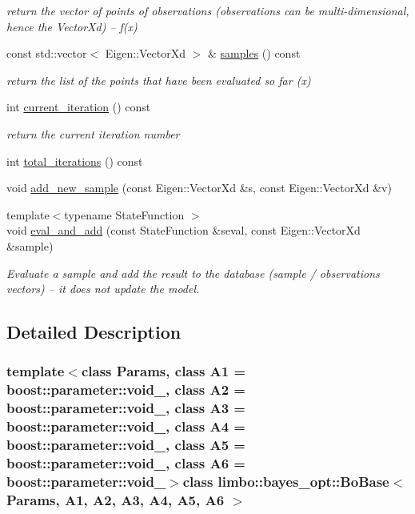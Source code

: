 \begin{DoxyCompactItemize}
\begin{DoxyCompactList}\small\item\em return the vector of points of observations (observations can be multi-\/dimensional, hence the Vector\+Xd) -- f(x) \end{DoxyCompactList}\item 
const std\+::vector$<$ Eigen\+::\+Vector\+Xd $>$ \& \hyperlink{classlimbo_1_1bayes__opt_1_1_bo_base_ad3ba0dba1418df0ed8e79d4dd3cc907a}{samples} () const 
\begin{DoxyCompactList}\small\item\em return the list of the points that have been evaluated so far (x) \end{DoxyCompactList}\item 
int \hyperlink{classlimbo_1_1bayes__opt_1_1_bo_base_ac3d643d5a668edf22ad053bfc54ea090}{current\+\_\+iteration} () const 
\begin{DoxyCompactList}\small\item\em return the current iteration number \end{DoxyCompactList}\item 
int \hyperlink{classlimbo_1_1bayes__opt_1_1_bo_base_a5470e106c4584a30636cafb6fbad6d73}{total\+\_\+iterations} () const 
\item 
void \hyperlink{classlimbo_1_1bayes__opt_1_1_bo_base_ac533d6397b0c0fa5ba0a4d03e0545fa2}{add\+\_\+new\+\_\+sample} (const Eigen\+::\+Vector\+Xd \&s, const Eigen\+::\+Vector\+Xd \&v)
\item 
{\footnotesize template$<$typename State\+Function $>$ }\\void \hyperlink{classlimbo_1_1bayes__opt_1_1_bo_base_a70e8e4fea1b56aedc943fe62170659e4}{eval\+\_\+and\+\_\+add} (const State\+Function \&seval, const Eigen\+::\+Vector\+Xd \&sample)
\begin{DoxyCompactList}\small\item\em Evaluate a sample and add the result to the \textquotesingle{}database\textquotesingle{} (sample / observations vectors) -- it does not update the model. \end{DoxyCompactList}\end{DoxyCompactItemize}


\subsection{Detailed Description}
\subsubsection*{template$<$class Params, class A1 = boost\+::parameter\+::void\+\_\+, class A2 = boost\+::parameter\+::void\+\_\+, class A3 = boost\+::parameter\+::void\+\_\+, class A4 = boost\+::parameter\+::void\+\_\+, class A5 = boost\+::parameter\+::void\+\_\+, class A6 = boost\+::parameter\+::void\+\_\+$>$class limbo\+::bayes\+\_\+opt\+::\+Bo\+Base$<$ Params, A1, A2, A3, A4, A5, A6 $>$}

